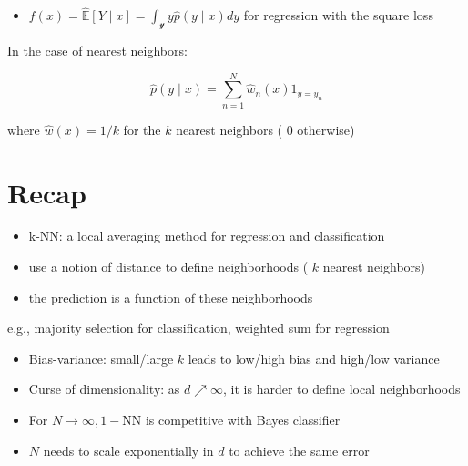 \documentclass[10pt]{article}
\begin{document}
\begin{itemize}
  \item $f(x)=\hat{\mathbb{E}}[Y \mid x]=\int_{\mathscr{y}} y \hat{p}(y \mid x) d y$ for regression with the square loss
\end{itemize}

In the case of nearest neighbors:

$$
\hat{p}(y \mid x)=\sum_{n=1}^{N} \hat{w}_{n}(x) 1_{y=y_{n}}
$$

where $\hat{w}(x)=1 / k$ for the $k$ nearest neighbors ( 0 otherwise)

\section*{Recap}
\begin{itemize}
  \item k-NN: a local averaging method for regression and classification
  \item use a notion of distance to define neighborhoods ( $k$ nearest neighbors)
  \item the prediction is a function of these neighborhoods
\end{itemize}

e.g., majority selection for classification, weighted sum for regression

\begin{itemize}
  \item Bias-variance: small/large $k$ leads to low/high bias and high/low variance

  \item Curse of dimensionality: as $d \nearrow \infty$, it is harder to define local neighborhoods

  \item For $N \rightarrow \infty, 1-\mathrm{NN}$ is competitive with Bayes classifier

  \item $N$ needs to scale exponentially in $d$ to achieve the same error

\end{itemize}
\end{document}
